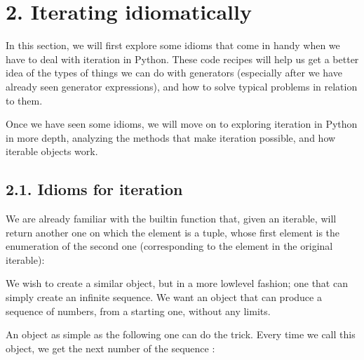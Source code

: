 \documentclass[a4paper,10pt,english]{sphinxmanual}
\begin{document}
\section{2. Iterating idiomatically}
\label{\detokenize{chapters/7_generators/index:iterating-idiomatically}}
In this section, we will first explore some idioms that come in handy when we have to deal
with iteration in Python. These code recipes will help us get a better idea of the types of
things we can do with generators (especially after we have already seen generator
expressions), and how to solve typical problems in relation to them.

Once we have seen some idioms, we will move on to exploring iteration in Python in more
depth, analyzing the methods that make iteration possible, and how iterable objects work.


\subsection{2.1. Idioms for iteration}
\label{\detokenize{chapters/7_generators/index:idioms-for-iteration}}
We are already familiar with the built\sphinxhyphen{}in  function that, given an iterable, will
return another one on which the element is a tuple, whose first element is the enumeration
of the second one (corresponding to the element in the original iterable):

\begin{sphinxVerbatim}[commandchars=\\\{\}]
\end{sphinxVerbatim}

We wish to create a similar object, but in a more low\sphinxhyphen{}level fashion; one that can simply
create an infinite sequence. We want an object that can produce a sequence of numbers,
from a starting one, without any limits.

An object as simple as the following one can do the trick. Every time we call this object, we
get the next number of the sequence :
\end{document}
